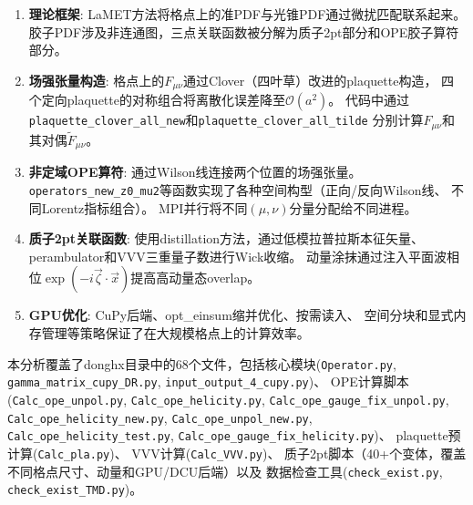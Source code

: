 \documentclass[12pt,a4paper]{ctexart}
\begin{document}
\begin{enumerate}[leftmargin=*]
    \item \textbf{理论框架}: LaMET方法将格点上的准PDF与光锥PDF通过微扰匹配联系起来。
    胶子PDF涉及非连通图，三点关联函数被分解为质子2pt部分和OPE胶子算符部分。

    \item \textbf{场强张量构造}: 格点上的$F_{\mu\nu}$通过Clover（四叶草）改进的plaquette构造，
    四个定向plaquette的对称组合将离散化误差降至$\mathcal{O}(a^2)$。
    代码中通过\texttt{plaquette\_clover\_all\_new}和\texttt{plaquette\_clover\_all\_tilde}
    分别计算$F_{\mu\nu}$和其对偶$\tilde{F}_{\mu\nu}$。

    \item \textbf{非定域OPE算符}: 通过Wilson线连接两个位置的场强张量。
    \texttt{operators\_new\_z0\_mu2}等函数实现了各种空间构型（正向/反向Wilson线、
    不同Lorentz指标组合）。
    MPI并行将不同$(\mu,\nu)$分量分配给不同进程。

    \item \textbf{质子2pt关联函数}: 使用distillation方法，通过低模拉普拉斯本征矢量、
    perambulator和VVV三重量子数进行Wick收缩。
    动量涂抹通过注入平面波相位$\exp(-i\vec{\zeta}\cdot\vec{x})$提高高动量态overlap。

    \item \textbf{GPU优化}: CuPy后端、opt\_einsum缩并优化、按需读入、
    空间分块和显式内存管理等策略保证了在大规模格点上的计算效率。
\end{enumerate}

本分析覆盖了donghx目录中的68个文件，包括核心模块(\texttt{Operator.py},
\texttt{gamma\_matrix\_cupy\_DR.py}, \texttt{input\_output\_4\_cupy.py})、
OPE计算脚本(\texttt{Calc\_ope\_unpol.py}, \texttt{Calc\_ope\_helicity.py},
\texttt{Calc\_ope\_gauge\_fix\_unpol.py}, \texttt{Calc\_ope\_helicity\_new.py},
\texttt{Calc\_ope\_unpol\_new.py}, \texttt{Calc\_ope\_helicity\_test.py},
\texttt{Calc\_ope\_gauge\_fix\_helicity.py})、
plaquette预计算(\texttt{Calc\_pla.py})、
VVV计算(\texttt{Calc\_VVV.py})、
质子2pt脚本（40+个变体，覆盖不同格点尺寸、动量和GPU/DCU后端）以及
数据检查工具(\texttt{check\_exist.py}, \texttt{check\_exist\_TMD.py})。
\end{document}
